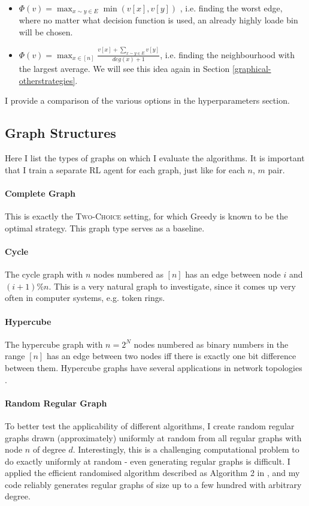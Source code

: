 \begin{itemize}
    \item 
    $\Phi(v)=\max_{x\sim y \in E} \min(v[x], v[y])$ , i.e. finding the worst edge, where no matter what decision function is used, an already highly loade bin will be chosen.
    \item
    $\Phi(v)=\max_{x \in [n]} \frac{v[x]+\sum_{x\sim y \in E}v[y]}{deg(x)+1}$, i.e. finding the neighbourhood with the largest average. We will see this idea again in Section \ref{graphical-otherstrategies}.
\end{itemize}


I provide a comparison of the various options in the hyperparameters section.


\subsection{Graph Structures}


Here I list the types of graphs on which I evaluate the algorithms. It is important that I train a separate RL agent for each graph, just like for each $n$, $m$ pair.


\paragraph{Complete Graph} This is exactly the \textsc{Two-Choice} setting, for which Greedy is known to be the optimal strategy. This graph type serves as a baseline.


\paragraph{Cycle} The cycle graph with $n$ nodes numbered as $[n]$ has an edge between node $i$ and $(i+1)\%n$. This is a very natural graph to investigate, since it comes up very often in computer systems, e.g. token rings.


\paragraph{Hypercube} The hypercube graph with $n=2^N$ nodes numbered as binary numbers in the range $[n]$ has an edge between two nodes iff there is exactly one bit difference between them. Hypercube graphs have several applications in network topologies \cite{ostrouchov1987hypercubenetwork} .


\paragraph{Random Regular Graph} To better test the applicability of different algorithms, I create random regular graphs drawn (approximately) uniformly at random from all regular graphs with node $n$ of degree $d$. Interestingly, this is a challenging computational problem to do exactly uniformly at random - even generating regular graphs is difficult. I applied the efficient randomised algorithm described as Algorithm 2 in \cite{steger1999randomregulargraphs}, and my code reliably generates regular graphs of size up to a few hundred with arbitrary degree.



